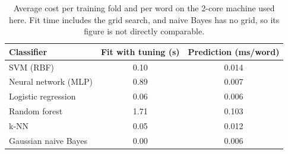 \begin{table}[H]\centering\small
\caption{Average cost per training fold and per word on the 2-core machine used here. Fit time includes the grid search, and naive Bayes has no grid, so its figure is not directly comparable.}\label{tab:cost}
\begin{tabular}{lcc}\toprule Classifier & Fit with tuning (s) & Prediction (ms/word)\\\midrule
SVM (RBF) & 0.10 & 0.014\\
Neural network (MLP) & 0.89 & 0.007\\
Logistic regression & 0.06 & 0.006\\
Random forest & 1.71 & 0.103\\
k-NN & 0.05 & 0.012\\
Gaussian naive Bayes & 0.00 & 0.006\\
\bottomrule\end{tabular}\end{table}

